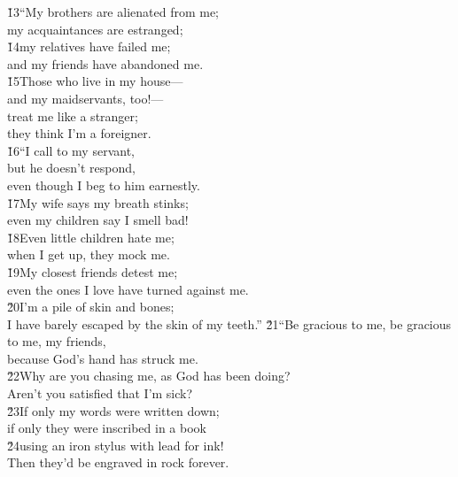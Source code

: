 \begin{poetry}
\poeml \v{13}``My brothers are alienated from me; \\
\poemll    my acquaintances are estranged; \\
\poeml \v{14}my relatives have failed me; \\
\poemll    and my friends have abandoned me. \\
\poeml \v{15}Those who live in my house--- \\
\poemll    and my maidservants, too!--- \\
\poeml treat me like a stranger; \\
\poemll    they think I'm a foreigner. \\
\poeml \v{16}``I call to my servant, \\
\poemll    but he doesn't respond, \\
\poemlll       even though I beg to him earnestly. \\
\poeml \v{17}My wife says my breath stinks; \\
\poemll    even my children say I smell bad! \\
\poeml \v{18}Even little children hate me; \\
\poemll    when I get up, they mock me. \\
\poeml \v{19}My closest friends detest me; \\
\poemll    even the ones I love have turned against me. \\
\poeml \v{20}I'm a pile of skin and bones; \\
\poemll    I have barely escaped by the skin of my teeth.''
\poeml \v{21}``Be gracious to me, be gracious to me, my friends, \\
\poemll    because God's hand has struck me. \\
\poeml \v{22}Why are you chasing me, as God has been doing? \\
\poemll    Aren't you satisfied that I'm sick? \\
\poeml \v{23}If only my words were written down; \\
\poemll    if only they were inscribed in a book \\
\poeml \v{24}using an iron stylus with lead for ink! \\
\poemll    Then they'd be engraved in rock forever. \\

\end{poetry}
